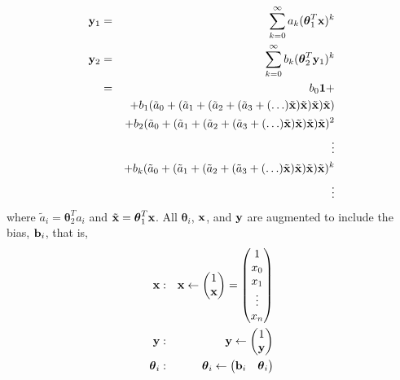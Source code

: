 \begin{eqnarray}
	{\bold y}_1 & = & \sum_{k=0}^\infty a_k (\boldsymbol\theta_1^T {\bold x})^k \nonumber \\
	{\bold y}_2 & = & \sum_{k=0}^\infty b_k (\boldsymbol\theta_2^T {\bold y}_1)^k \nonumber \\
		& = & b_0 {\bold 1} + \nonumber\\
		&   & + b_1 (\tilde a_0 +%
					(\tilde a_1 + %
						(\tilde a_2 + %
							(\tilde a_3 + %
								(\ldots) \tilde {\bold x} )%
							\tilde {\bold x} )%
						\tilde {\bold x} )%
					\tilde {\bold x}) \nonumber \\
		&   & + b_2 (\tilde a_0 +%
					(\tilde a_1 + %
						(\tilde a_2 + %
							(\tilde a_3 + %
								(\ldots) \tilde {\bold x} )%
							\tilde {\bold x} )%
						\tilde {\bold x} )%
					\tilde {\bold x})^2 \nonumber \\
		&   & \vdots \nonumber \\
		&   & + b_k (\tilde a_0 +%
					(\tilde a_1 + %
						(\tilde a_2 + %
							(\tilde a_3 + %
								(\ldots) \tilde {\bold x} )%
							\tilde {\bold x} )%
						\tilde {\bold x} )%
					\tilde {\bold x})^k \nonumber \\
		&   & \vdots
\end{eqnarray}
\noindent where $\tilde a_i = \boldsymbol\theta_2^T a_i$ and $\tilde{\bold x} = \boldsymbol\theta_1^T {\bold x}$. All $\boldsymbol\theta_i$, ${\bold x}$, and ${\bold y}$ are augmented to include the bias, ${\bold b}_i$, that is,
\begin{eqnarray}
	{\bold x}&:& {\bold x} \leftarrow \begin{pmatrix}
								1 \\
								{\bold x}
							\end{pmatrix} = \begin{pmatrix}
											1 \\
											x_0 \\
											x_1 \\
											\vdots \\
											x_n
										\end{pmatrix}\\
	{\bold y}&:& {\bold y} \leftarrow \begin{pmatrix}
								1 \\
								{\bold y}
							\end{pmatrix} \\
	\boldsymbol\theta_i&:& \boldsymbol\theta_i \leftarrow \begin{pmatrix} {\bold b}_i & \boldsymbol\theta_i \end{pmatrix}
\end{eqnarray}
